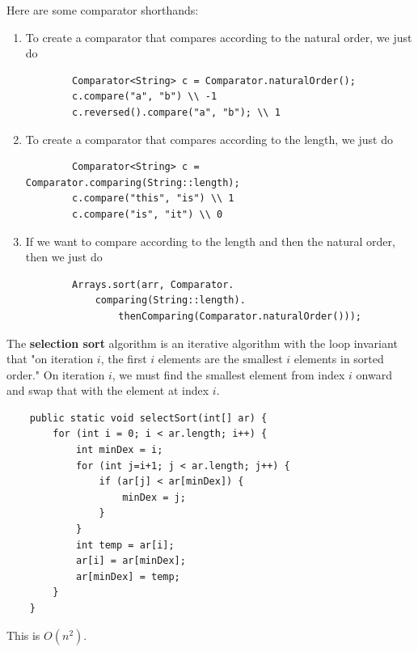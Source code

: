 \documentclass{article}
\begin{document}
    \begin{theorem}
    Here are some comparator shorthands: 
    \begin{enumerate}
        \item To create a comparator that compares according to the natural order, we just do 
        \begin{lstlisting}
        Comparator<String> c = Comparator.naturalOrder(); 
        c.compare("a", "b") \\ -1 
        c.reversed().compare("a", "b"); \\ 1
        \end{lstlisting}
        
        \item To create a comparator that compares according to the length, we just do 
        \begin{lstlisting}
        Comparator<String> c = Comparator.comparing(String::length); 
        c.compare("this", "is") \\ 1 
        c.compare("is", "it") \\ 0 
        \end{lstlisting}
        
        \item If we want to compare according to the length and then the natural order, then we just do 
        \begin{lstlisting}
        Arrays.sort(arr, Comparator.
            comparing(String::length).
                thenComparing(Comparator.naturalOrder())); 
        \end{lstlisting}
    \end{enumerate}
    \end{theorem}

    \begin{definition}
    The \textbf{selection sort} algorithm is an iterative algorithm with the loop invariant that "on iteration $i$, the first $i$ elements are the smallest $i$ elements in sorted order." On iteration $i$, we must find the smallest element from index $i$ onward and swap that with the element at index $i$. 
    \begin{lstlisting}
    public static void selectSort(int[] ar) {
        for (int i = 0; i < ar.length; i++) {
            int minDex = i; 
            for (int j=i+1; j < ar.length; j++) {
                if (ar[j] < ar[minDex]) {
                    minDex = j; 
                }
            }
            int temp = ar[i]; 
            ar[i] = ar[minDex]; 
            ar[minDex] = temp; 
        }
    }
    \end{lstlisting}
    This is $O(n^2)$. 
    \end{definition}
\end{document}
